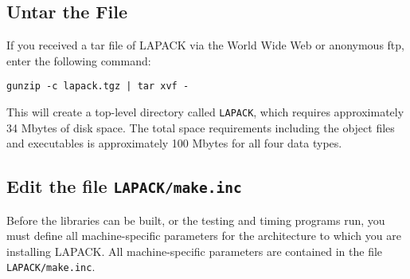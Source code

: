 \begin{enumerate}
%
%
\end{enumerate}
 
\subsection{Untar the File}

If you received a tar file of LAPACK via the World Wide
Web or anonymous ftp, enter the following command:

\begin{list}{}
\item{{\tt gunzip -c lapack.tgz | tar xvf -}}
\end{list}

\noindent
This will create a top-level directory called {\tt LAPACK}, which
requires approximately 34 Mbytes of disk space.
The total space requirements including the object files and executables
is approximately 100 Mbytes for all four data types.

\subsection{Edit the file {\tt LAPACK/make.inc}}

\dent
Before the libraries can be built, or the testing and timing programs
run, you must define all machine-specific parameters for the
architecture to which you are installing LAPACK.  All machine-specific
parameters are contained in the file {\tt LAPACK/make.inc}.

